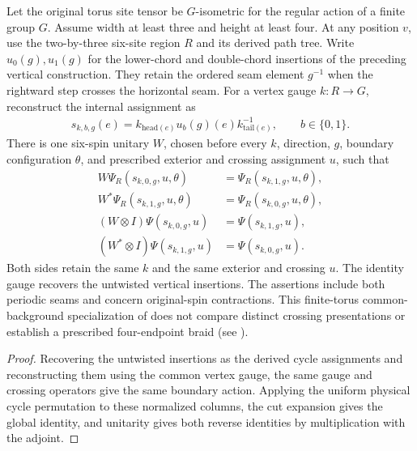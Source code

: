 \begin{lemma}
    \label{thm:peps_torus_gauged_vertical_flux_move}
    \leanok
    Let the original torus site tensor be $G$-isometric for the regular action
    of a finite group $G$. Assume width at least three and height at least
    four. At any position $v$, use the two-by-three six-site region
    $R$ and its derived path tree. Write $u_0(g),u_1(g)$ for the lower-chord
    and double-chord insertions of the preceding vertical construction.
    They retain the ordered seam element $g^{-1}$ when the rightward step
    crosses the horizontal seam. For a vertex gauge $k:R\to G$, reconstruct
    the internal assignment as
    \begin{align}
        s_{k,b,g}(e)
        =k_{\mathrm{head}(e)}u_b(g)(e)k_{\mathrm{tail}(e)}^{-1},
        \qquad b\in\{0,1\}.
    \end{align}
    There is one six-spin unitary $W$, chosen before every $k$, direction,
    $g$, boundary configuration $\theta$, and prescribed exterior and crossing
    assignment $u$, such that
    \begin{align}
        W\Psi_R(s_{k,0,g},u,\theta)     & =\Psi_R(s_{k,1,g},u,\theta), \\
        W^*\Psi_R(s_{k,1,g},u,\theta)   & =\Psi_R(s_{k,0,g},u,\theta), \\
        (W\otimes I)\Psi(s_{k,0,g},u)   & =\Psi(s_{k,1,g},u),          \\
        (W^*\otimes I)\Psi(s_{k,1,g},u) & =\Psi(s_{k,0,g},u).
    \end{align}
    Both sides retain the same $k$ and the same exterior and crossing $u$.
    The identity gauge recovers the untwisted vertical insertions. The
    assertions include both periodic seams and concern original-spin
    contractions. This finite-torus common-background specialization of
    \cite[accessible systems and Theorem~6.16]{Schuch2010PEPS} does not
    compare distinct crossing presentations or establish a prescribed
    four-endpoint braid (see \cite{gap:rmp_peps_quantum_double_g_isometry}).
\end{lemma}

\begin{proof}\leanok
    Recovering the untwisted insertions as the derived cycle assignments and
    reconstructing them using the common vertex gauge, the same gauge and
    crossing operators give the same boundary action. Applying the
    uniform physical cycle permutation to these normalized columns, the
    cut expansion gives the global identity, and unitarity gives
    both reverse identities by multiplication with the adjoint.
\end{proof}
